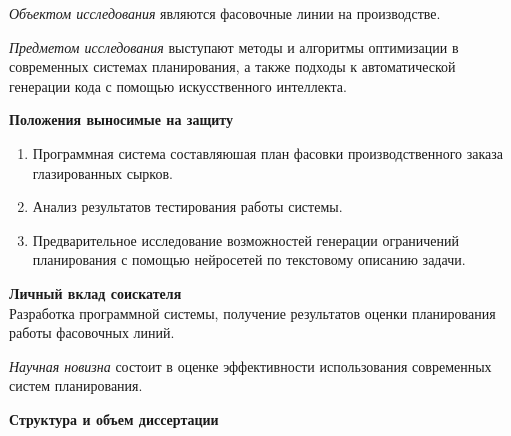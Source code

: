 \vspace{6mm}


\textit{Объектом исследования} являются фасовочные линии на производстве.

\vspace{6mm}

\textit{Предметом исследования} выступают методы и алгоритмы оптимизации в современных системах планирования, а также подходы к автоматической генерации кода с помощью искусственного интеллекта.

\vspace{6mm}

\noindent \textbf{Положения выносимые на защиту}
\begin{enumerate}
    \item Программная система составляюшая план фасовки производственного заказа глазированных сырков.
    \item Анализ результатов тестирования работы системы.
    \item Предварительное исследование возможностей генерации ограничений планирования с помощью нейросетей по текстовому описанию задачи.
\end{enumerate}

\vspace{6mm}

\noindent \textbf{Личный вклад соискателя}\\
\indent Разработка программной системы, получение результатов оценки планирования работы фасовочных линий.

\vspace{6mm}

\textit{Научная новизна} состоит в оценке эффективности использования современных систем планирования.

\vspace{6mm}

\noindent \textbf{Структура и объем диссертации}\\
